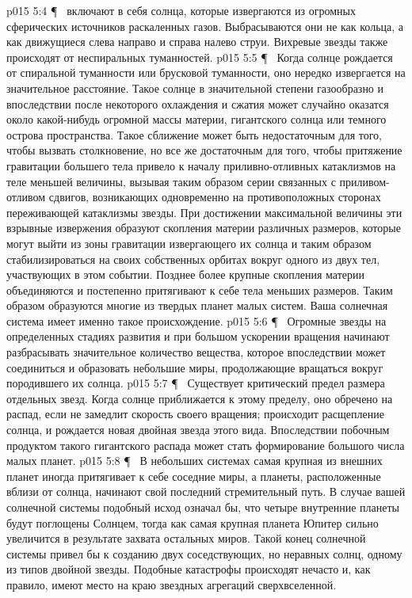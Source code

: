 \vs p015 5:4 \P\ \bibnobreakspace {} включают в себя солнца, которые извергаются из огромных сферических источников раскаленных газов. Выбрасываются они не как кольца, а как движущиеся слева направо и справа налево струи. Вихревые звезды также происходят от неспиральных туманностей.
\vs p015 5:5 \P\ \bibnobreakspace {} Когда солнце рождается от спиральной туманности или брусковой туманности, оно нередко извергается на значительное расстояние. Такое солнце в значительной степени газообразно и впоследствии после некоторого охлаждения и сжатия может случайно оказатся около какой\hyp{}нибудь огромной массы материи, гигантского солнца или темного острова пространства. Такое сближение может быть недостаточным для того, чтобы вызвать столкновение, но все же достаточным для того, чтобы притяжение гравитации большего тела привело к началу приливно\hyp{}отливных катаклизмов на теле меньшей величины, вызывая таким образом серии связанных с приливом\hyp{}отливом сдвигов, возникающих одновременно на противоположных сторонах переживающей катаклизмы звезды. При достижении максимальной величины эти взрывные извержения образуют скопления материи различных размеров, которые могут выйти из зоны гравитации извергающего их солнца и таким образом стабилизироваться на своих собственных орбитах вокруг одного из двух тел, участвующих в этом событии. Позднее более крупные скопления материи объединяются и постепенно притягивают к себе тела меньших размеров. Таким образом образуются многие из твердых планет малых систем. Ваша солнечная система имеет именно такое происхождение.
\vs p015 5:6 \P\ \bibnobreakspace {} Огромные звезды на определенных стадиях развития и при большом ускорении вращения начинают разбрасывать значительное количество вещества, которое впоследствии может соединиться и образовать небольшие миры, продолжающие вращаться вокруг породившего их солнца.
\vs p015 5:7 \P\ \bibnobreakspace {} Существует критический предел размера отдельных звезд. Когда солнце приближается к этому пределу, оно обречено на распад, если не замедлит скорость своего вращения; происходит расщепление солнца, и рождается новая двойная звезда этого вида. Впоследствии побочным продуктом такого гигантского распада может стать формирование большого числа малых планет.
\vs p015 5:8 \P\ \bibnobreakspace {} В небольших системах самая крупная из внешних планет иногда притягивает к себе соседние миры, а планеты, расположенные вблизи от солнца, начинают свой последний стремительный путь. В случае вашей солнечной системы подобный исход означал бы, что четыре внутренние планеты будут поглощены Солнцем, тогда как самая крупная планета Юпитер сильно увеличится в результате захвата остальных миров. Такой конец солнечной системы привел бы к созданию двух соседствующих, но неравных солнц, одному из типов двойной звезды. Подобные катастрофы происходят нечасто и, как правило, имеют место на краю звездных агрегаций сверхвселенной.
